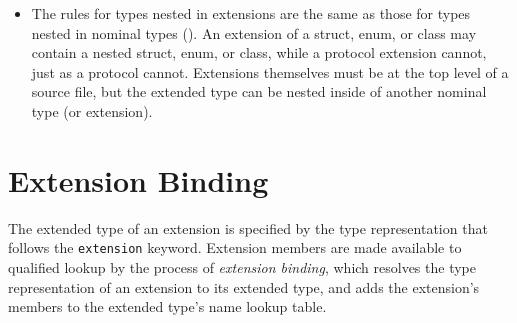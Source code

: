 \documentclass[../generics]{subfiles}
\begin{document}
\begin{itemize}
\item The rules for types nested in extensions are the same as those for types nested in nominal types (). An extension of a struct, enum, or class may contain a nested struct, enum, or class, while a protocol extension cannot, just as a protocol cannot. Extensions themselves must be at the top level of a source file, but the extended type can be nested inside of another nominal type (or extension).
\end{itemize}

\section{Extension Binding}\label{extension binding}

The extended type of an extension is specified by the type representation that follows the \texttt{extension} keyword. Extension members are made available to qualified lookup by the process of \emph{extension binding}, which resolves the type representation of an extension to its extended type, and adds the extension's members to the extended type's name lookup table.
\end{document}
